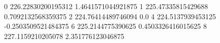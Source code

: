 0 226.22830200195312 1.4641571044921875
1 225.47335815429688 0.7092132568359375
2 224.76414489746094 0.0
4 224.5137939453125 -0.2503509521484375
6 225.2144775390625 0.4503326416015625
8 227.1159210205078 2.351776123046875
